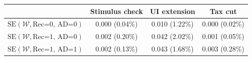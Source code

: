 \begin{tabular}{@{}lccc@{}}
\toprule
                          & Stimulus check      & UI extension    & Tax cut    \\  \midrule
$\mathrm{SE}(\mathcal{W}, \text{Rec=0, AD=0})$ & 0.000 (0.04\%)  & 0.010 (1.22\%)  & 0.000 (0.02\%)     \\
$\mathrm{SE}(\mathcal{W}, \text{Rec=1, AD=0})$ & 0.002 (0.20\%)  & 0.042 (2.02\%)  & 0.001 (0.05\%)     \\
$\mathrm{SE}(\mathcal{W}, \text{Rec=1, AD=1})$ & 0.002 (0.13\%)  & 0.043 (1.68\%)  & 0.003 (0.28\%)     \\ \bottomrule
\end{tabular}

